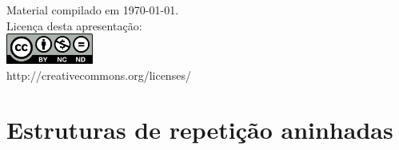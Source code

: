 \documentclass[portuguese,10pt,xcolor=table]{bredelebeamer}
\title{\insertlecture}
\author{Prof. Fernando Figueira\\(adaptado do material do Prof. Rafael Beserra Gomes)}
\institute{UFRN}
\date{}
\begin{document}
\begin{frame}
  \maketitle
 \begin{center}
 \tiny
Material compilado em \today.\\
  Licença desta apresentação:\\
		\includegraphics[height=1.0cm]{by-nc-nd.png}\\
http://creativecommons.org/licenses/
	\end{center}
\end{frame}


\def\WN[#1]{\cellcolor{white!40}#1}
\def\VN[#1]{\cellcolor{blue!40}#1}
\def\UN[#1]{\cellcolor{green!40}#1}
\def\ZN[#1]{\cellcolor{deepgreen!90}#1}
\def\RN[#1]{\cellcolor{red!40}#1}
\def\DRN[#1]{\cellcolor{deepred!90}#1}


\section{Estruturas de repetição aninhadas}

	\begin{frame}[c]
		\begin{center}
			\structure{\large \insertsection}
		\end{center}
	\end{frame} 
	
\end{document}
